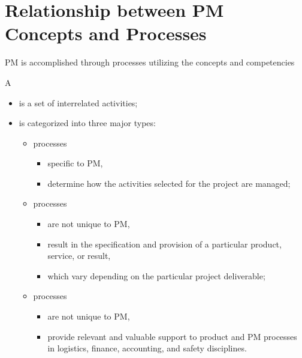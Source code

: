 \documentclass[letterpaper,10pt,english]{jupyterBook}
\begin{document}
\section{Relationship between PM Concepts and Processes}
\label{\detokenize{PM/pm-concepts:relationship-between-pm-concepts-and-processes}}
\sphinxAtStartPar
PM is accomplished through processes utilizing the concepts and competencies

\sphinxAtStartPar
A 
\begin{itemize}
\item {} 
\sphinxAtStartPar
is a set of interrelated activities;

\item {} 
\sphinxAtStartPar
is categorized into three major types:
\begin{itemize}
\item {} 
\sphinxAtStartPar
{} processes
\begin{itemize}
\item {} 
\sphinxAtStartPar
specific to PM,

\item {} 
\sphinxAtStartPar
determine how the activities selected for the project are managed;

\end{itemize}

\item {} 
\sphinxAtStartPar
{} processes
\begin{itemize}
\item {} 
\sphinxAtStartPar
are not unique to PM,

\item {} 
\sphinxAtStartPar
result in the specification and provision of a particular product, service, or result,

\item {} 
\sphinxAtStartPar
which vary depending on the particular project deliverable;

\end{itemize}

\item {} 
\sphinxAtStartPar
{} processes
\begin{itemize}
\item {} 
\sphinxAtStartPar
are not unique to PM,

\item {} 
\sphinxAtStartPar
provide relevant and valuable support to product and PM processes in logistics, finance, accounting, and safety disciplines.

\end{itemize}

\end{itemize}

\end{itemize}
\end{document}
